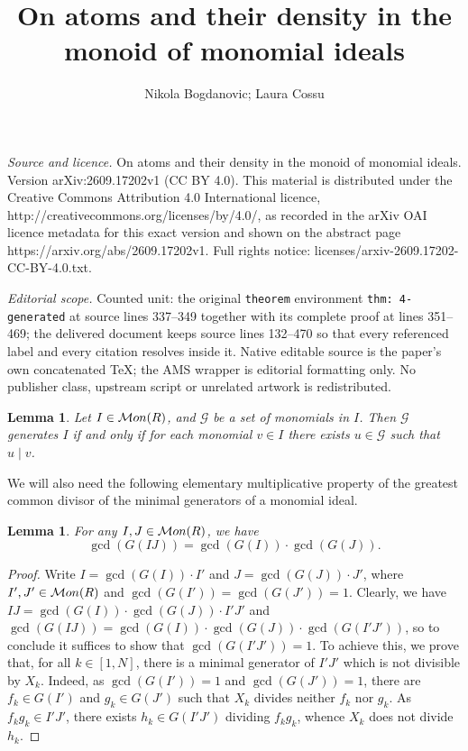 \documentclass[10pt,a4paper]{amsart}
\newtheorem{lemma}[theorem]{Lemma}
\providecommand\Mon{{\mathcal{M}{\rm on}}}
\begin{document}
\title[On atoms and their density in the monoid of monomial ideals]{On atoms and their density in the monoid of monomial ideals}
\author{Nikola Bogdanovic; Laura Cossu}
\date{}
\maketitle
\noindent\emph{Source and licence.} On atoms and their density in the monoid of monomial ideals. Version arXiv:2609.17202v1 (CC BY 4.0). This material is distributed under the Creative Commons Attribution 4.0 International licence, http://creativecommons.org/licenses/by/4.0/, as recorded in the arXiv OAI licence metadata for this exact version and shown on the abstract page https://arxiv.org/abs/2609.17202v1. Full rights notice: licenses/arxiv-2609.17202-CC-BY-4.0.txt.\par\smallskip
\noindent\textit{Editorial scope.} Counted unit: the original \texttt{theorem} environment \texttt{thm: 4-generated} at source lines 337--349 together with its complete proof at lines 351--469; the delivered document keeps source lines 132--470 so that every referenced label and every citation resolves inside it. Native editable source is the paper's own concatenated TeX; the AMS wrapper is editorial formatting only. No publisher class, upstream script or unrelated artwork is redistributed.
\begin{lemma}\label{lem: mon_gen}
Let $I\in\Mon(R)$, and $\mathcal G$ be a set of monomials in $I$. Then $\mathcal G$ generates $I$ if and only if for each monomial $v\in I$ there exists $u\in\mathcal G$ such that $u\mid v$.
\end{lemma}

We will also need the following elementary multiplicative property of the greatest common divisor of the minimal generators of a monomial ideal.
\begin{lemma}\label{lem: gcd IJ}
    For any $I,J\in\Mon(R)$, we have
    \[ \gcd(G(IJ)) = \gcd(G(I))\cdot\gcd(G(J)). \]
\end{lemma}
\begin{proof}
    Write $I=\gcd(G(I))\cdot I'$ and $J=\gcd(G(J))\cdot J'$, where $I',J'\in\Mon(R)$ and $\gcd(G(I'))=\gcd(G(J'))=1$. Clearly, we have $IJ = \gcd(G(I))\cdot \gcd(G(J))\cdot I'J'$ and $\gcd(G(IJ)) = \gcd(G(I))\cdot \gcd(G(J))\cdot \gcd(G(I'J'))$, so to conclude it suffices to show that $\gcd(G(I'J'))=1$. To achieve this, we prove that, for all $k\in [1,N]$, there is a minimal generator of $I'J'$ which is not divisible by $X_k$. Indeed, as $\gcd(G(I'))=1$ and $\gcd(G(J'))=1$, there are $f_k\in G(I')$ and $g_k\in G(J')$ such that $X_k$ divides neither $f_k$ nor $g_k$. As $f_kg_k\in I'J'$, there exists $h_k\in G(I'J')$ dividing $f_kg_k$, whence $X_k$ does not divide $h_k$.
\end{proof}
\end{document}
